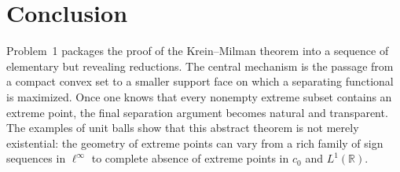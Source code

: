 \documentclass[reqno]{amsart}
\theoremstyle{definition}
\begin{document}
\section{Conclusion}

Problem~1 packages the proof of the Krein--Milman theorem into a sequence of elementary but
revealing reductions. The central mechanism is the passage from a compact convex set to a
smaller support face on which a separating functional is maximized. Once one knows that every
nonempty extreme subset contains an extreme point, the final separation argument becomes
natural and transparent. The examples of unit balls show that this abstract theorem is not
merely existential: the geometry of extreme points can vary from a rich family of sign
sequences in $\ell^\infty$ to complete absence of extreme points in $c_0$ and $L^1(\mathbb{R})$.



\end{document}
